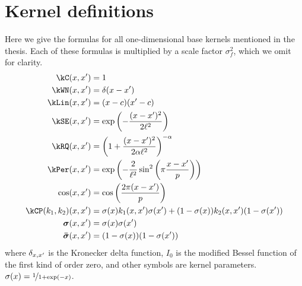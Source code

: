 \chapter{Kernel definitions}
\label{ch:appendix-kernels}
\label{sec:kernel-definitions}

\newcommand{\scalefactor}{}


Here we give the formulas for all one-dimensional base kernels mentioned in the thesis.
Each of these formulas is multiplied by a scale factor $\sigma_f^2$, which we omit for clarity.
\begin{align}
\kC(\inputVar, \inputVar') & = \scalefactor 1 \\
\kWN(\inputVar, \inputVar') & = \scalefactor \delta(\inputVar - \inputVar') \label{eq:appendix-wn}\\
\kLin(\inputVar, \inputVar') & = \scalefactor (\inputVar - c)(\inputVar' - c)  \label{eq:appendix-lin} \\
\kSE(\inputVar, \inputVar') & = \scalefactor \exp\left(-\frac{(\inputVar - \inputVar')^2}{2\ell^2}\right)  \label{eq:appendix-se}\\
\kRQ(x, x') & = \scalefactor \left( 1 + \frac{(\inputVar - \inputVar')^2}{2\alpha\ell^2}\right)^{-\alpha}  \label{eq:appendix-rq}\\
\kPer(x, x') & = \exp\left(-\frac{2}{\ell^2} \sin^2 \left( \pi \frac{\inputVar - \inputVar'}{p} \right)\right) \\
\cos(x, x') & = \scalefactor \cos\left(\frac{2 \pi (x - x')}{p}\right) \label{eq:appendix-cos} \\
\kCP(\kernel_1, \kernel_2)(x, x') & = \scalefactor \sigma(x) k_1(x,x')\sigma(x') + (1-\sigma(x)) k_2(x,x')(1-\sigma(x')) \\
\boldsymbol\sigma(\inputVar, \inputVar') & = \scalefactor \sigma(x)\sigma(x') \\
\boldsymbol{\bar\sigma}(\inputVar, \inputVar') & = \scalefactor (1-\sigma(x))(1-\sigma(x'))
\end{align}
where $\delta_{x, x'}$ is the Kronecker delta function, $I_0$ is the modified Bessel function of the first kind of order zero, and other symbols are kernel parameters.
${\sigma(x) = \nicefrac{1}{1 + \exp(-x)}}$.

